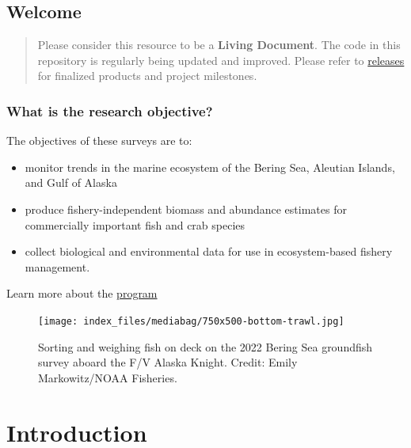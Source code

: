 \documentclass[
  letterpaper,
  oneside,
  open=any]{scrbook}
\providecommand{\tightlist}{%
  \setlength{\itemsep}{0pt}\setlength{\parskip}{0pt}}\usepackage{longtable,booktabs,array}
\begin{document}
\hypertarget{welcome-1}{%
\chapter*{Welcome}\label{welcome-1}}


\begin{quote}
Please consider this resource to be a \textbf{Living Document}. The code
in this repository is regularly being updated and improved. Please refer
to
\href{https://github.com/afsc-gap-products/gap_products/releases}{releases}
for finalized products and project milestones.
\end{quote}

\hypertarget{what-is-the-research-objective}{%
\section{What is the research
objective?}\label{what-is-the-research-objective}}

The objectives of these surveys are to:

\begin{itemize}
\tightlist
\item
  monitor trends in the marine ecosystem of the Bering Sea, Aleutian
  Islands, and Gulf of Alaska
\item
  produce fishery-independent biomass and abundance estimates for
  commercially important fish and crab species
\item
  collect biological and environmental data for use in ecosystem-based
  fishery management.
\end{itemize}

Learn more about the
\href{https://www.fisheries.noaa.gov/alaska/science-data/groundfish-assessment-program-bottom-trawl-surveys}{program}

\begin{figure}

{\centering \texttt{[image: index\_files/mediabag/750x500-bottom-trawl.jpg]}

}

\caption{Sorting and weighing fish on deck on the 2022 Bering Sea
groundfish survey aboard the F/V Alaska Knight. Credit: Emily
Markowitz/NOAA Fisheries.}

\end{figure}

\part{Introduction}
\end{document}

